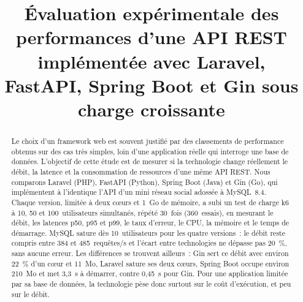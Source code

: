 \documentclass[conference,a4paper]{IEEEtran}
\begin{document}
\title{Évaluation expérimentale des performances d'une API REST implémentée
avec Laravel, FastAPI, Spring Boot et Gin sous charge croissante}

\author{
\and
{}
\and
{}
\and
{}
\and
{}
}

\maketitle

\begin{abstract}
Le choix d'un framework web est souvent justifié par des classements de
performance obtenus sur des cas très simples, loin d'une application
réelle qui interroge une base de données. L'objectif de cette étude est
de mesurer si la technologie change réellement le débit, la latence et
la consommation de ressources d'une même API REST. Nous comparons
Laravel (PHP), FastAPI (Python), Spring Boot (Java) et Gin (Go), qui
implémentent à l'identique l'API d'un mini réseau social adossée à
MySQL~8.4. Chaque version, limitée à deux cœurs et 1~Go de mémoire, a
subi un test de charge k6 à 10, 50 et 100~utilisateurs simultanés,
répété 30~fois (360~essais), en mesurant le débit, les latences p50,
p95 et p99, le taux d'erreur, le CPU, la mémoire et le temps de
démarrage. MySQL sature dès 10~utilisateurs pour les quatre versions~:
le débit reste compris entre 384 et 485~requêtes/s et l'écart entre
technologies ne dépasse pas 20~\%, sans aucune erreur. Les différences
se trouvent ailleurs~: Gin sert ce débit avec environ 22~\% d'un cœur
et 11~Mo, Laravel sature ses deux cœurs, Spring Boot occupe environ
210~Mo et met 3,3~s à démarrer, contre 0,45~s pour Gin. Pour une
application limitée par sa base de données, la technologie pèse donc
surtout sur le coût d'exécution, et peu sur le débit.
\end{abstract}
\end{document}

